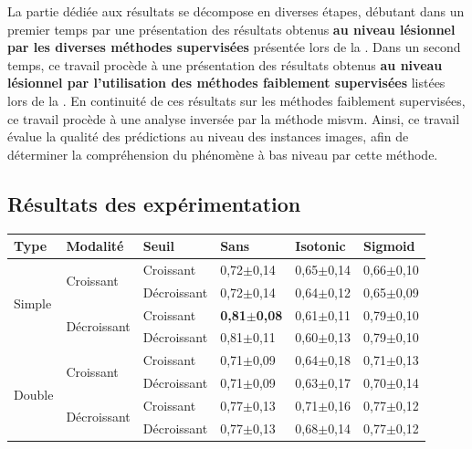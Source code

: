 La partie dédiée aux résultats se décompose en diverses étapes, débutant dans un premier temps par une présentation des résultats obtenus \textbf{au niveau lésionnel par les diverses méthodes supervisées} présentée lors de la . Dans un second temps, ce travail procède à une présentation des résultats obtenus \textbf{au niveau lésionnel par l'utilisation des méthodes faiblement supervisées} listées lors de la . En continuité de ces résultats sur les méthodes faiblement supervisées, ce travail procède à une analyse inversée par la méthode \gls{misvm}. Ainsi, ce travail évalue la qualité des prédictions au niveau des instances images, afin de déterminer la compréhension du phénomène à bas niveau par cette méthode.\par
\clearpage

\subsection{Résultats des expérimentation}

\begin{table}[H]
    \begin{tabular}{llllll}
        \toprule 
        Type                    & Modalité                          & Seuil             & Sans                  & Isotonic              & Sigmoid               \\ \midrule
        \multirow{4}{*}{Simple} & \multirow{2}{*}{Croissant}        & Croissant         & 0,72$\pm$0,14         & 0,65$\pm$0,14         & 0,66$\pm$0,10         \\ \cline{3-6}
                                &                                   & Décroissant       & 0,72$\pm$0,14         & 0,64$\pm$0,12         & 0,65$\pm$0,09         \\ \cline{2-6}
                                & \multirow{2}{*}{Décroissant}      & Croissant         & \textbf{0,81$\pm$0,08}& 0,61$\pm$0,11         & 0,79$\pm$0,10         \\ \cline{3-6}
                                &                                   & Décroissant       & 0,81$\pm$0,11         & 0,60$\pm$0,13         & 0,79$\pm$0,10         \\ \cline{1-6}
        \multirow{4}{*}{Double} & \multirow{2}{*}{Croissant}        & Croissant         & 0,71$\pm$0,09         & 0,64$\pm$0,18         & 0,71$\pm$0,13         \\ \cline{3-6}
                                &                                   & Décroissant       & 0,71$\pm$0,09         & 0,63$\pm$0,17         & 0,70$\pm$0,14         \\ \cline{2-6}
                                & \multirow{2}{*}{Décroissant}      & Croissant         & 0,77$\pm$0,13         & 0,71$\pm$0,16         & 0,77$\pm$0,12         \\ \cline{3-6}
                                &                                   & Décroissant       & 0,77$\pm$0,13         & 0,68$\pm$0,14         & 0,77$\pm$0,12         \\ \bottomrule
    \end{tabular}
\end{table}

